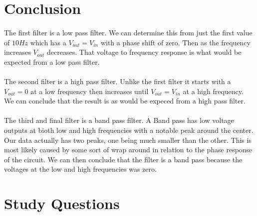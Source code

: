 \documentclass{article}
\begin{document}
\clearpage

\section*{Conclusion}
\paragraph{}
The first filter is a low pass filter. We can determine this from just the first value of $10Hz$ which has a 
$V_{out} = V_{in}$ with a phase shift of zero. Then as the frequency increases $V_{out}$ decreases. That
voltage to frequency response is what would be expected from a low pass filter.
\paragraph{}
The second filter is a high pass filter. Unlike the first filter it starts with a $V_{out} = 0$ at a low frequency
 then increases until $V_{out} = V_{in}$ at a high frequency. We can conclude that the result is as would be 
 expeced from a high pass filter.
 \paragraph{}
 The third and final filter is a band pass filter. A Band pass has low voltage outputs at bioth low and high frequencies 
 with a notable peak around the center. Our data actually has two peaks, one being much smaller than the other. This 
 is most likely caused by some sort of wrap around in relation to the phase response of the circuit. We can then conclude
 that the filter is a band pass because the voltages at the low and high frequencies was zero.

\section*{Study Questions}
\end{document}

